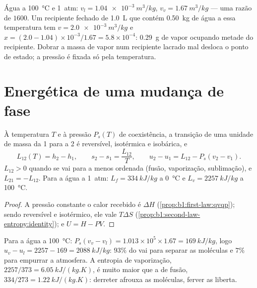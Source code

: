\begin{example}\label{ex:b1:phase-changes:lever}
Água a \qty{100}{\degreeCelsius} e \qty{1}{atm}: $v_l = \qty{1.04e-3}{m^3/kg}$,
$v_v = \qty{1.67}{m^3/kg}$ --- uma razão de $1600$. Um recipiente fechado de \qty{1.0}{L}
que contém \qty{0.50}{kg} de água a essa temperatura tem $v =
\qty{2.0e-3}{m^3/kg}$ e $x = (2.0 - 1.04) \times 10^{-3}/1.67 = 5.8 \times 10^{-4}$:
\qty{0.29}{g} de vapor ocupando metade do recipiente. Dobrar a massa de
vapor num recipiente lacrado mal desloca o ponto de estado; a pressão é
fixada só pela temperatura.
\end{example}

\section{Energética de uma mudança de fase}

\begin{proposition}\label{prop:b1:phase-changes:latent}
À temperatura $T$ e à pressão $P_s(T)$ de coexistência, a
transição de uma unidade de massa da  1 para a  2 é reversível,
isotérmica e isobárica, e
\[
L_{12}(T) = h_2 - h_1 , \qquad s_2 - s_1 = \frac{L_{12}}{T} , \qquad
u_2 - u_1 = L_{12} - P_s(v_2 - v_1) .
\]
$L_{12} > 0$ quando se vai para a  menos ordenada (fusão,
vaporização, sublimação), e $L_{21} = -L_{12}$. Para a água a \qty{1}{atm}:
$L_f = \qty{334}{kJ/kg}$ a \qty{0}{\degreeCelsius} e $L_v = \qty{2257}{kJ/kg}$ a
\qty{100}{\degreeCelsius}.
\end{proposition}

\begin{proof}
A pressão constante o calor recebido é $\Delta H$
(\cref{prop:b1:first-law:qvqp}); sendo reversível e isotérmico, ele vale
$T\Delta S$ (\cref{prop:b1:second-law-entropy:identity}); e $U = H - PV$.
\end{proof}

\begin{example}\label{ex:b1:phase-changes:whereheat}
Para a água a \qty{100}{\degreeCelsius}: $P_s(v_v - v_l) = 1.013 \times 10^5 \times
1.67 = \qty{169}{kJ/kg}$, logo $u_v - u_l = 2257 - 169 = \qty{2088}{kJ/kg}$:
$93\%$ do  vai para separar as moléculas e $7\%$
para empurrar a atmosfera. A entropia de vaporização,
$2257/373 = \qty{6.05}{kJ/(kg.K)}$, é muito maior que a de fusão, $334/273 =
\qty{1.22}{kJ/(kg.K)}$: derreter afrouxa as moléculas, ferver as liberta.
\end{example}

